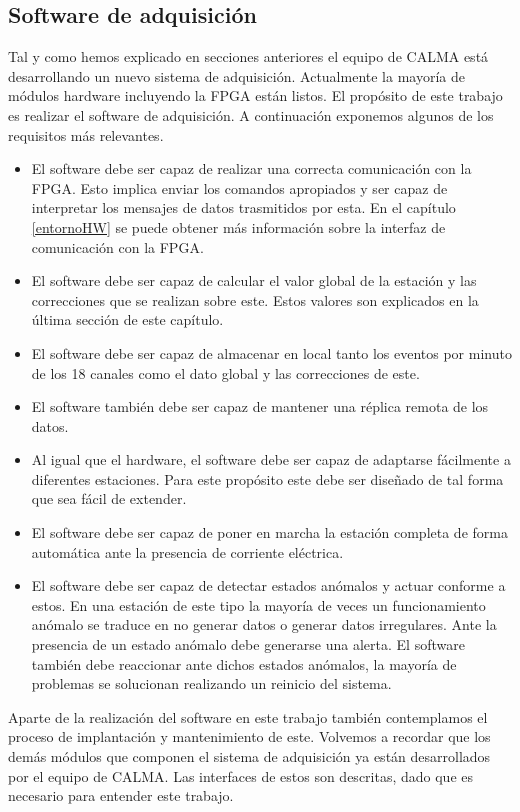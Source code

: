 	\subsection{Software de adquisición}
		Tal y como hemos explicado en secciones anteriores el equipo de CALMA está desarrollando un nuevo sistema de adquisición. Actualmente
		la mayoría de módulos hardware incluyendo la FPGA están listos. El propósito de este trabajo es realizar el software de adquisición. A
		continuación exponemos algunos de los requisitos más relevantes.
		\begin{itemize}
			\item 	El software debe ser capaz de realizar una correcta comunicación con la FPGA. Esto implica enviar los comandos
				apropiados y ser capaz de interpretar los mensajes de datos trasmitidos por esta. En el capítulo \ref{entornoHW} se
				puede obtener más información sobre la interfaz de comunicación con la FPGA.
			\item 	El software debe ser capaz de calcular el valor global de la estación y las correcciones que se realizan sobre este.
			  	Estos valores son explicados en la última sección de este capítulo.
			\item	El software debe ser capaz de almacenar en local tanto los eventos por minuto de los 18 canales como el dato global y
			  	las correcciones de este.
			\item 	El software también debe ser capaz de mantener una réplica remota de los datos.
			\item 	Al igual que el hardware, el software debe ser capaz de adaptarse fácilmente a diferentes estaciones. Para este
				propósito este debe ser diseñado de tal forma que sea fácil de extender.
			\item 	El software debe ser capaz de poner en marcha la estación completa de forma automática ante la presencia de corriente
			  	eléctrica. 
			\item 	El software debe ser capaz de detectar estados anómalos y actuar conforme a estos. En una estación de este tipo la
				mayoría de veces un funcionamiento anómalo se traduce en no generar datos o generar datos irregulares. Ante la
				presencia de un estado anómalo debe generarse una alerta. El software también debe reaccionar ante dichos estados
				anómalos, la mayoría de problemas se solucionan realizando un reinicio del sistema.
		\end{itemize}
		Aparte de la realización del software en este trabajo también contemplamos el proceso de implantación y mantenimiento de este.
		Volvemos a recordar que los demás módulos que componen el sistema de adquisición ya están desarrollados por el equipo de CALMA. Las
		interfaces de estos son descritas, dado que es necesario para entender este trabajo.
